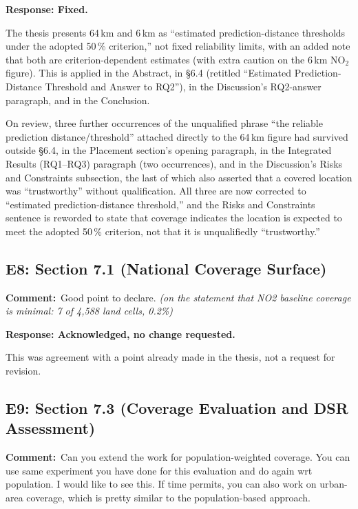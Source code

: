 \documentclass[11pt,a4paper]{article}
\newcommand{\rjcomment}[1]{\par\noindent\textbf{Comment:}\ #1\par}
\newcommand{\rjresponse}[1]{\par\noindent\textbf{Response: #1}\par}
\begin{document}
\rjresponse{Fixed.}
The thesis presents 64\,km and 6\,km as ``estimated prediction-distance thresholds under the
adopted 50\,\% criterion,'' not fixed reliability limits, with an added note that both are
criterion-dependent estimates (with extra caution on the 6\,km NO$_2$ figure). This is applied
in the Abstract, in \S6.4 (retitled ``Estimated Prediction-Distance Threshold and Answer to
RQ2''), in the Discussion's RQ2-answer paragraph, and in the Conclusion.

On review, three further occurrences of the unqualified phrase ``the reliable prediction
distance/threshold'' attached directly to the 64\,km figure had survived outside \S6.4, in the
Placement section's opening paragraph, in the Integrated Results (RQ1--RQ3) paragraph (two
occurrences), and in the Discussion's Risks and Constraints subsection, the last of which also
asserted that a covered location was ``trustworthy'' without qualification. All three are now
corrected to ``estimated prediction-distance threshold,'' and the Risks and Constraints sentence
is reworded to state that coverage indicates the location is expected to meet the adopted 50\,\%
criterion, not that it is unqualifiedly ``trustworthy.''

\subsection{E8: Section 7.1 (National Coverage Surface)}

\rjcomment{Good point to declare. \emph{(on the statement that NO2 baseline coverage is minimal:
7 of 4,588 land cells, 0.2\%)}}

\rjresponse{Acknowledged, no change requested.}
This was agreement with a point already made in the thesis, not a request for revision.

\subsection{E9: Section 7.3 (Coverage Evaluation and DSR Assessment)}

\rjcomment{Can you extend the work for population-weighted coverage. You can use same experiment
you have done for this evaluation and do again wrt population. I would like to see this. If time
permits, you can also work on urban-area coverage, which is pretty similar to the
population-based approach.}
\end{document}
